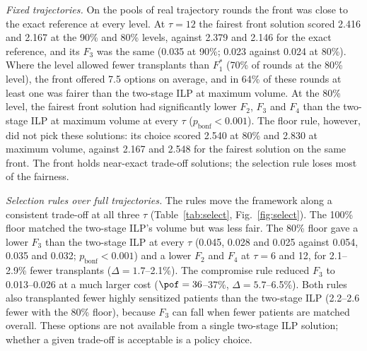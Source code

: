 \emph{Fixed trajectories.} On the pools of real trajectory rounds the
front was close to the exact reference at every level. At $\tau = 12$
the fairest front solution scored 2.416 and 2.167 at the 90\% and
80\% levels, against 2.379 and 2.146 for the exact reference, and its
$F_3$ was the same (0.035 at 90\%; 0.023 against 0.024 at 80\%).
Where the level allowed fewer transplants than $F_1^{*}$ (70\% of
rounds at the 80\% level), the front offered 7.5 options on average,
and in 64\% of these rounds at least one was fairer than the two-stage
ILP at maximum volume. At the 80\% level, the fairest front solution
had significantly lower $F_2$, $F_3$ and $F_4$ than the two-stage ILP
at maximum volume at every $\tau$ ($p_{\mathrm{bonf}} < 0.001$). The
floor rule, however, did not pick these solutions: its choice scored
2.540 at 80\% and 2.830 at maximum volume, against 2.167 and 2.548 for
the fairest solution on the same front. The front holds near-exact
trade-off solutions; the selection rule loses most of the fairness.

\emph{Selection rules over full trajectories.} The rules move the
framework along a consistent trade-off at all three $\tau$
(Table~\ref{tab:select}, Fig.~\ref{fig:select}). The 100\% floor matched
the two-stage ILP's volume but was less fair. The 80\% floor gave a
lower $F_3$ than the two-stage ILP at every $\tau$ (0.045, 0.028 and
0.025 against 0.054, 0.035 and 0.032; $p_{\mathrm{bonf}} < 0.001$) and
a lower $F_2$ and $F_4$ at $\tau = 6$ and 12, for 2.1--2.9\% fewer
transplants ($\Delta = 1.7$--2.1\%). The compromise rule reduced $F_3$
to 0.013--0.026 at a much larger cost ($\pof = 36$--37\%,
$\Delta = 5.7$--6.5\%). Both rules also transplanted fewer highly
sensitized patients than the two-stage ILP (2.2--2.6 fewer with the
80\% floor), because $F_3$ can fall when fewer patients are matched
overall. These options are not available from a single two-stage ILP
solution; whether a given trade-off is acceptable is a policy choice.

